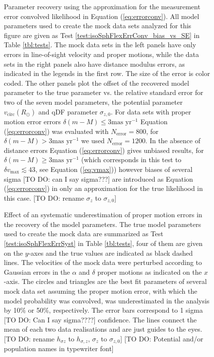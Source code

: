 \addtocounter{figure}{-1}
\begin{figure} [t!]
\caption{Parameter recovery using the approximation for the measurement error convolved likelihood in Equation (\ref{eq:errorconv}). All model parameters used to create the mock data sets analyzed for this figure are given as Test \ref{test:isoSphFlexErrConv_bias_vs_SE} in Table \ref{tbl:tests}. The mock data sets in the left panels have only errors in line-of-sight velocity and proper motions, while the data sets in the right panels also have distance modulus errors, as indicated in the legends in the first row. The size of the error is color coded. The other panels plot the offset of the recovered model parameter to the true parameter vs. the relative standard error for two of the seven model parameters, the potential parameter $v_\text{circ}(R_\odot)$ and qDF parameter $\sigma_{z,0}$. For data sets with proper motion error errors $\delta(m-M) \leq 3 \text{mas yr}^{-1}$ Equation (\ref{eq:errorconv}) was evaluated with $N_\text{error}=800$, for $\delta(m-M) > 3 \text{mas yr}^{-1}$ we used $N_\text{error}=1200$. In the absence of distance errors Equation (\ref{eq:errorconv}) gives unbiased results, for $\delta(m-M) \geq 3 \text{mas yr}^{-1}$ (which corresponds in this test to $\delta v_\text{max} \lesssim 43$, see Equation (\ref{eq:vmax})) however biases of several sigma [TO DO: can I say sigma???] are introduced as Equation (\ref{eq:errorconv}) in only an approximation for the true likelihood in this case. [TO DO: rename  $\sigma_z$ to $\sigma_{z,0}$]}
\label{fig:isoSphFlexErrConv_bias_vs_SE}
\end{figure}





\begin{figure}
\caption{Effect of an systematic underestimation of proper motion errors in the recovery of the model parameters. The true model parameters used to create the mock data are summarized as Test \ref{test:isoSphFlexErrSyst} in Table \ref{tbl:tests}, four of them are given on the $y$-axes and the true values are indicated as black dashed lines. The velocities of the mock data were perturbed according to Gaussian errors in the $\alpha$ and $\delta$ proper motions as indicated on the $x$-axis.   The circles and triangles are the best fit parameters of several mock data set assuming the proper motion error, with which the model probability was convolved, was underestimated in the analysis by 10\% or 50\%, respectively. The error bars correspond to 1 sigma [TO DO: Can I say sigma????] confidence. The lines connect the mean of each two data realisations and are just guides to the eyes. [TO DO: rename $h_{\sigma z}$ to $h_{\sigma,z}$, $\sigma_z$ to $\sigma_{z,0}$] [TO DO: Potential and/or population names in typewriter font]}
\label{fig:isoSphFlexErrSyst}
\end{figure}

